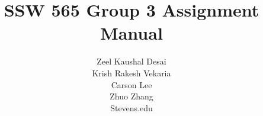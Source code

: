%

\begin{titlepage}
        \title{SSW 565 Group 3 Assignment Manual}
        \author{Zeel Kaushal Desai \\ Krish Rakesh Vekaria \\ Carson Lee \\ Zhuo Zhang \\ Stevens.edu }
        \conferraldate{}{\today} \maketitle
\end{titlepage}

\makecopyright

\begin{abstract}
\end{abstract}


% 


\contentspage

\tablelistpage

\figurelistpage

